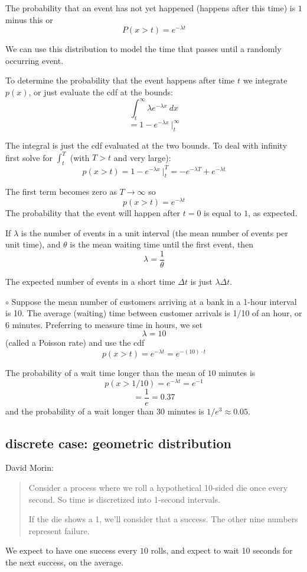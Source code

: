 \documentclass[11pt, oneside]{article}   	%
\begin{document}
The probability that an event has not yet happened (happens after this time) is $1$ minus this or
\[ P(x > t) = e^{-\lambda t}  \]

We can use this distribution to model the time that passes until a randomly occurring event.

To determine the probability that the event happens after time $t$ we integrate $p(x)$, or just evaluate the cdf at the bounds:
\[ \int_t^{\infty} \lambda e^{-\lambda x} \ dx \]
\[ = 1 - e^{-\lambda x}  \ \bigg |_t^{\infty} \]

The integral is just the cdf evaluated at the two bounds.  To deal with infinity first solve for $\int_t^T $ (with $T > t$ and very large):
\[ p(x > t) = 1 - e^{-\lambda x} \ \bigg |_t^T = -  e^{-\lambda T} +  e^{-\lambda t} \]

The first term becomes zero as $T \rightarrow \infty$ so
\[ p(x > t) = e^{-\lambda t} \]
The probability that the event will happen after $t = 0$ is equal to $1$, as expected.

If $\lambda$ is the number of events in a unit interval (the mean number of events per unit time), and $\theta$ is the mean waiting time until the first event, then
\[ \lambda = \frac{1}{\theta} \]

The expected number of events in a short time $\Delta t$ is just $\lambda \Delta t$.

$\circ$ Suppose the mean number of customers arriving at a bank in a 1-hour interval is 10. The average (waiting) time between customer arrivals is 1/10 of an hour, or 6 minutes.  Preferring to measure time in hours, we set
\[ \lambda = 10 \]
(called a Poisson rate) and use the cdf
\[ p(x > t) = e^{-\lambda t} = e^{- (10) \cdot t} \]

The probability of a wait time longer than the mean of $10$ minutes is
\[ p(x > 1/10) = e^{-\lambda t} = e^{-1} \] 
\[ = \frac{1}{e} = 0.37 \]
and the probability of a wait longer than $30$ minutes is $1/e^3 \approx 0.05$.

\subsection*{discrete case:  geometric distribution}

David Morin:
\begin{quote}\color{blue}Consider a process where we roll a hypothetical 10-sided die once every second. So time is discretized into 1-second intervals.

If the die shows a 1, we'll consider that a success. The other nine numbers represent failure.
\color{black}\end{quote}
We expect to have one success every $10$ rolls, and expect to wait 10 seconds for the next success, on the average.
\end{document}
